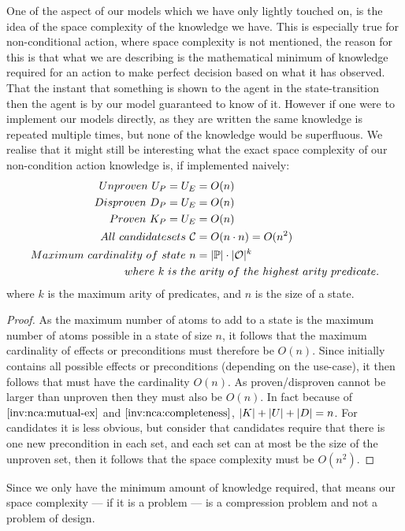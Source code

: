 \documentclass[../Master.tex]{subfiles}
\begin{document}
One of the aspect of our models which we have only lightly touched on, is the idea of the space complexity of the knowledge we have.
This is especially true for non-conditional action, where space complexity is not mentioned, 
the reason for this is that what we are describing is the mathematical minimum of knowledge required for an action to make perfect decision based on what it has observed.
That the instant that something is shown to the agent in the state-transition then the agent is by our model guaranteed to know of it.
However if one were to implement our models directly, as they are written the same knowledge is repeated multiple times, but none of the knowledge would be superfluous.
We realise that it might still be interesting what the exact space complexity of our non-condition action knowledge is, if implemented naively:
 \begin{align*}
 	Unproven ~U_P = U_E & = O(n) \\
 	Disproven~D_P = U_E & = O(n) \\
 	Proven~K_P = U_E &= O(n) \\
 	All ~ candidate sets~ \mathcal{C} & = O(n \cdot n)=O(n^2) \\
 	Maximum ~ cardinality~ of ~ state  ~ n & = |\mathbb{P}| \cdot |\mathcal{O}|^k \\
 	where ~ k ~ is ~ the&  ~ arity ~ of ~ the~ highest~ arity ~ predicate.
 \end{align*} 
 where $k$ is the maximum arity of predicates, and $n$ is the size of a state.
 \begin{proof} 
 	As the maximum number of atoms to add to a state is the maximum number of atoms possible in a state of size $n$,
 	it follows that the maximum cardinality of effects or preconditions must therefore be $O(n)$.
Since \up initially contains all possible effects or preconditions (depending on the use-case), 
	it then follows that \Up must have the cardinality $O(n)$. 
	As proven/disproven cannot be larger than unproven then they must also be $O(n)$.
	In fact because of $\Cref{inv:nca:mutual-ex}$ and $\Cref{inv:nca:completeness}$, $|K|+|U|+|D| = n$.
	For candidates it is less obvious, but consider that candidates require that there is one new precondition in
	each set, and each set can at most be the size of the unproven set, then it follows that the space complexity must be $O(n^2)$.
 \end{proof}
Since we only have the minimum amount of knowledge required, that means our space complexity --- if it is a problem --- is a compression problem and not a problem of design. 
\end{document}
